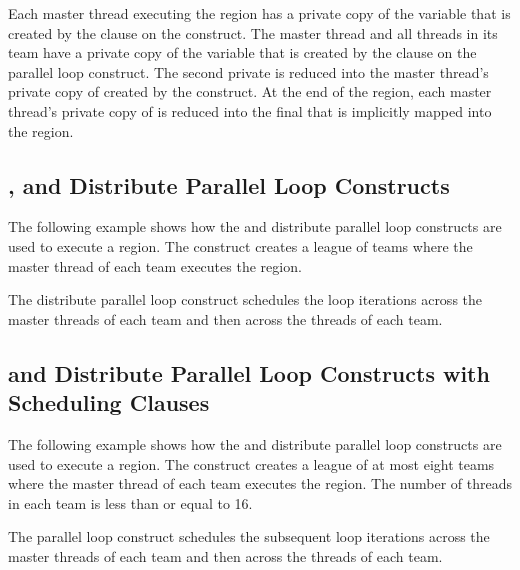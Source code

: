 Each master thread executing the  region has a private copy of the 
variable  that is created by the  clause on the  construct. 
The master thread and all threads in its team have a private copy of the variable 
 that is created by the  clause on the parallel loop construct. 
The second private  is reduced into the master thread's private copy of  
created by the  construct. At the end of the  region, 
each master thread's private copy of  is reduced into the final  that is 
implicitly mapped into the  region.



\subsection{ , and Distribute Parallel Loop Constructs}
\label{subsec:teams_distribute_parallel}

The following example shows how the   and distribute 
parallel loop constructs are used to execute a  region. The  
 construct creates a league of teams where the master thread of each 
team executes the  region.

The distribute parallel loop construct schedules the loop iterations across the 
master threads of each team and then across the threads of each team.



\subsection{  and Distribute Parallel Loop 
Constructs with Scheduling Clauses}
\label{subsec:teams_distribute_parallel_schedule}

The following example shows how the   and distribute 
parallel loop constructs are used to execute a  region. The  
construct creates a league of at most eight teams where the master thread of each 
team executes the  region. The number of threads in each team is 
less than or equal to 16.

The  parallel loop construct schedules the subsequent loop iterations 
across the master threads of each team and then across the threads of each team.

